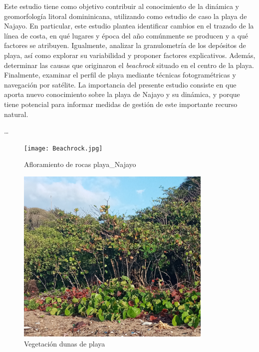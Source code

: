 \documentclass[11pt,]{article}
\begin{document}
Este estudio tiene como objetivo contribuir al conocimiento de la
dinámica y geomorfología litoral domininicana, utilizando como estudio
de caso la playa de Najayo. En particular, este estudio plantea
identificar cambios en el trazado de la línea de costa, en qué lugares y
época del año comúnmente se producen y a qué factores se atribuyen.
Igualmente, analizar la granulometría de los depósitos de playa, así
como explorar su variabilidad y proponer factores explicativos. Además,
determinar las causas que originaron el \emph{beachrock} situado en el
centro de la playa. Finalmente, examinar el perfil de playa mediante
técnicas fotogramétricas y navegación por satélite. La importancia del
presente estudio consiste en que aporta nuevo conocimiento sobre la
playa de Najayo y su dinámica, y porque tiene potencial para informar
medidas de gestión de este importante recurso natural.

\ldots

\begin{figure}
\centering
\texttt{[image: Beachrock.jpg]}
\caption{Afloramiento de rocas playa\_Najayo\label{beachrock}}
\end{figure}

\begin{figure}
\centering
\includegraphics[height=3.33333in]{Cocoloba_uvifera.jpg}
\caption{Vegetación dunas de playa\label{cocoloba}}
\end{figure}
\end{document}
